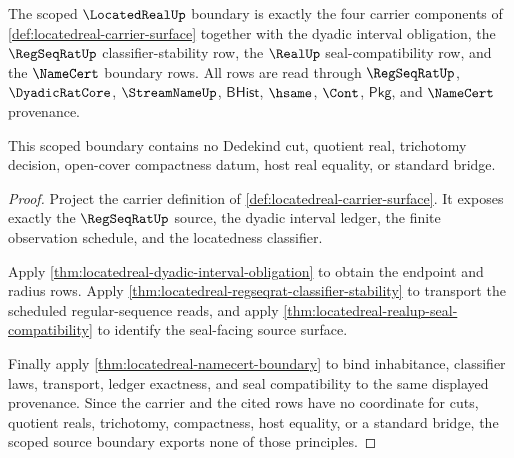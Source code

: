 \begin{theorem}
\label{thm:locatedreal-scoped-source-boundary}
The scoped $\LocatedRealUp$ boundary is exactly the four carrier components of \autoref{def:locatedreal-carrier-surface} together with the dyadic interval obligation, the $\RegSeqRatUp$ classifier-stability row, the $\RealUp$ seal-compatibility row, and the $\NameCert$ boundary rows. All rows are read through $\RegSeqRatUp$, $\DyadicRatCore$, $\StreamNameUp$, $\mathsf{BHist}$, $\hsame$, $\Cont$, $\mathsf{Pkg}$, and $\NameCert$ provenance.

This scoped boundary contains no Dedekind cut, quotient real, trichotomy decision, open-cover compactness datum, host real equality, or standard bridge.
\end{theorem}
\begin{proof}
Project the carrier definition of \autoref{def:locatedreal-carrier-surface}. It exposes exactly the $\RegSeqRatUp$ source, the dyadic interval ledger, the finite observation schedule, and the locatedness classifier.

Apply \autoref{thm:locatedreal-dyadic-interval-obligation} to obtain the endpoint and radius rows. Apply \autoref{thm:locatedreal-regseqrat-classifier-stability} to transport the scheduled regular-sequence reads, and apply \autoref{thm:locatedreal-realup-seal-compatibility} to identify the seal-facing source surface.

Finally apply \autoref{thm:locatedreal-namecert-boundary} to bind inhabitance, classifier laws, transport, ledger exactness, and seal compatibility to the same displayed provenance. Since the carrier and the cited rows have no coordinate for cuts, quotient reals, trichotomy, compactness, host equality, or a standard bridge, the scoped source boundary exports none of those principles.
\end{proof}

